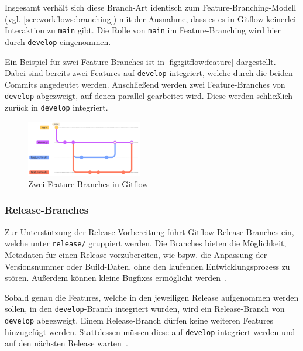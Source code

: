 Insgesamt verhält sich diese Branch\hyp Art identisch zum Feature\hyp Branching\hyp Modell (vgl. \autoref{sec:workflows:branching}) mit der Ausnahme, dass es es in Gitflow keinerlei Interaktion zu \texttt{main} gibt. Die Rolle von \texttt{main} im Feature\hyp Branching wird hier durch \texttt{develop} eingenommen.

Ein Beispiel für zwei Feature\hyp Branches ist in \autoref{fig:gitflow:feature} dargestellt. Dabei sind bereits zwei Features auf \texttt{develop} integriert, welche durch die beiden Commits angedeutet werden. Anschließend werden zwei Feature\hyp Branches von \texttt{develop} abgezweigt, auf denen parallel gearbeitet wird. Diese werden schließlich zurück in \texttt{develop} integriert.

\begin{figure}
    \includegraphics[width=0.45\textwidth]{src/assets/diagrams/gitflow/feature.pdf}
    \caption{Zwei Feature-Branches in Gitflow}
    \label{fig:gitflow:feature}
\end{figure}


\subsubsection{Release-Branches}

Zur Unterstützung der Release\hyp Vorbereitung führt Gitflow Release\hyp Branches ein, welche unter \texttt{release/} gruppiert werden. Die Branches bieten die Möglichkeit, Metadaten für einen Release vorzubereiten, wie bspw. die Anpassung der Versionsnummer oder Build-Daten, ohne den laufenden Entwicklungsprozess zu stören. Außerdem können kleine Bugfixes ermöglicht werden~\cite{driessenSuccessfulGitBranching2010}.

Sobald genau die Features, welche in den jeweiligen Release aufgenommen werden sollen, in den \texttt{develop}-Branch integriert wurden, wird ein Release\hyp Branch von \texttt{develop} abgezweigt. Einem Release\hyp Branch dürfen keine weiteren Features hinzugefügt werden. Stattdessen müssen diese auf \texttt{develop} integriert werden und auf den nächsten Release warten~\cite{driessenSuccessfulGitBranching2010}.

